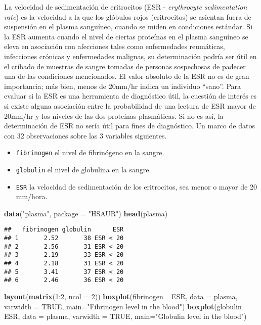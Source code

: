 \documentclass[]{article}
\def\tightlist{}
\newenvironment{Shaded}{\begin{snugshade}}{\end{snugshade}}
\newcommand{\KeywordTok}[1]{\textcolor[rgb]{0.13,0.29,0.53}{\textbf{{#1}}}}
\newcommand{\DataTypeTok}[1]{\textcolor[rgb]{0.13,0.29,0.53}{{#1}}}
\newcommand{\DecValTok}[1]{\textcolor[rgb]{0.00,0.00,0.81}{{#1}}}
\newcommand{\StringTok}[1]{\textcolor[rgb]{0.31,0.60,0.02}{{#1}}}
\newcommand{\OtherTok}[1]{\textcolor[rgb]{0.56,0.35,0.01}{{#1}}}
\newcommand{\NormalTok}[1]{{#1}}
\numberwithin{equation}{section}
\begin{document}
La velocidad de sedimentación de eritrocitos (ESR - \emph{erythrocyte
sedimentation rate}) es la velocidad a la que los glóbulos rojos
(eritrocitos) se asientan fuera de suspensión en el plasma sanguíneo,
cuando se miden en condiciones estándar. Si la ESR aumenta cuando el
nivel de ciertas proteínas en el plasma sanguíneo se eleva en asociación
con afecciones tales como enfermedades reumáticas, infecciones crónicas
y enfermedades malignas, su determinación podría ser útil en el cribado
de muestras de sangre tomadas de personas sospechosas de padecer una de
las condiciones mencionados. El valor absoluto de la ESR no es de gran
importancia; más bien, menos de 20mm/hr indica un individuo ``sano''.
Para evaluar si la ESR es una herramienta de diagnóstico útil, la
cuestión de interés es si existe alguna asociación entre la probabilidad
de una lectura de ESR mayor de 20mm/hr y los niveles de las dos
proteínas plasmáticas. Si no es así, la determinación de ESR no sería
útil para fines de diagnóstico. Un marco de datos con 32 observaciones
sobre las 3 variables siguientes.

\begin{itemize}
\tightlist
\item
  \texttt{fibrinogen} el nivel de fibrinógeno en la sangre.
\item
  \texttt{globulin} el nivel de globulina en la sangre.
\item
  \texttt{ESR} la velocidad de sedimentación de los eritrocitos, sea
  menor o mayor de 20 mm/hora.
\end{itemize}

\begin{Shaded}
\begin{Highlighting}[]
\KeywordTok{data}\NormalTok{(}\StringTok{"plasma"}\NormalTok{, }\DataTypeTok{package =} \StringTok{"HSAUR"}\NormalTok{)}
\KeywordTok{head}\NormalTok{(plasma)}
\end{Highlighting}
\end{Shaded}

\begin{verbatim}
##   fibrinogen globulin      ESR
## 1       2.52       38 ESR < 20
## 2       2.56       31 ESR < 20
## 3       2.19       33 ESR < 20
## 4       2.18       31 ESR < 20
## 5       3.41       37 ESR < 20
## 6       2.46       36 ESR < 20
\end{verbatim}

\begin{Shaded}
\begin{Highlighting}[]
\KeywordTok{layout}\NormalTok{(}\KeywordTok{matrix}\NormalTok{(}\DecValTok{1}\NormalTok{:}\DecValTok{2}\NormalTok{, }\DataTypeTok{ncol =} \DecValTok{2}\NormalTok{))}
\KeywordTok{boxplot}\NormalTok{(fibrinogen ~}\StringTok{ }\NormalTok{ESR, }\DataTypeTok{data =} \NormalTok{plasma, }\DataTypeTok{varwidth =} \OtherTok{TRUE}\NormalTok{, }\DataTypeTok{main=}\StringTok{"Fibrinogen level in the blood"}\NormalTok{)}
\KeywordTok{boxplot}\NormalTok{(globulin ~}\StringTok{ }\NormalTok{ESR, }\DataTypeTok{data =} \NormalTok{plasma, }\DataTypeTok{varwidth =} \OtherTok{TRUE}\NormalTok{, }\DataTypeTok{main=}\StringTok{"Globulin level in the blood"}\NormalTok{)}
\end{Highlighting}
\end{Shaded}
\end{document}
